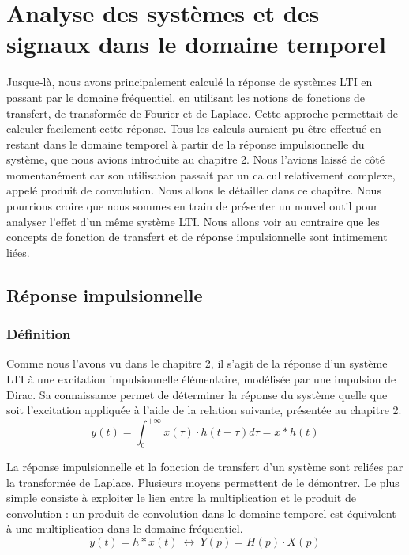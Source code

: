 \chapter{Analyse des systèmes et des signaux dans le domaine temporel}
	
	Jusque-là, nous avons principalement calculé la réponse de systèmes LTI en passant par le domaine fréquentiel, en utilisant les notions de fonctions de transfert, de transformée de Fourier et de Laplace. Cette approche permettait de calculer facilement cette réponse.
	Tous les calculs auraient pu être effectué en restant dans le domaine temporel à partir de la réponse impulsionnelle du système, que nous avions introduite au chapitre 2. Nous l'avions laissé de côté momentanément car son utilisation passait par un calcul relativement complexe, appelé produit de convolution. Nous allons le détailler dans ce chapitre.
	Nous pourrions croire que nous sommes en train de présenter un nouvel outil pour analyser l'effet d'un même système LTI. Nous allons voir au contraire que les concepts de fonction de transfert et de réponse impulsionnelle sont intimement liées.
	
	
	\section{Réponse impulsionnelle}
	
	\subsection{Définition}
	
	Comme nous l'avons vu dans le chapitre 2, il s'agit de la réponse d'un système LTI à une excitation impulsionnelle élémentaire, modélisée par une impulsion de Dirac. Sa connaissance permet de déterminer la réponse du système quelle que soit l'excitation appliquée à l'aide de la relation suivante, présentée au chapitre 2.
	\begin{equation}\label{Calcul_reponse_temporel_causal}
	y(t) = \int_{0}^{+ \infty} x(\tau) \cdot h(t-\tau)d\tau = x*h(t)
	\end{equation}
	\vspace{1\baselineskip}
	
	La réponse impulsionnelle et la fonction de transfert d'un système sont reliées par la transformée de Laplace. Plusieurs moyens permettent de le démontrer. Le plus simple consiste à exploiter le lien entre la multiplication et le produit de convolution : un produit de convolution dans le domaine temporel est équivalent à une multiplication dans le domaine fréquentiel.
	\begin{equation}\label{}
	y(t) =  h*x(t) ~\longleftrightarrow~Y(p)=H(p)\cdot X(p)
	\end{equation}
	
